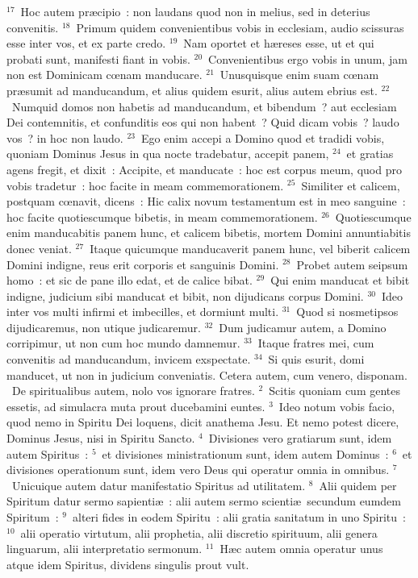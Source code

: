 ${}^{17}$~Hoc autem pr\ae cipio~: non laudans quod non in melius, sed in deterius convenitis.
${}^{18}$~Primum quidem convenientibus vobis in ecclesiam, audio scissuras esse inter vos, et ex parte credo.
${}^{19}$~Nam oportet et h\ae reses esse, ut et qui probati sunt, manifesti fiant in vobis.
${}^{20}$~Convenientibus ergo vobis in unum, jam non est Dominicam cœnam manducare.
${}^{21}$~Unusquisque enim suam cœnam pr\ae sumit ad manducandum, et alius quidem esurit, alius autem ebrius est.
${}^{22}$~Numquid domos non habetis ad manducandum, et bibendum~? aut ecclesiam Dei contemnitis, et confunditis eos qui non habent~? Quid dicam vobis~? laudo vos~? in hoc non laudo.
${}^{23}$~Ego enim accepi a Domino quod et tradidi vobis, quoniam Dominus Jesus in qua nocte tradebatur, accepit panem,
${}^{24}$~et gratias agens fregit, et dixit~: Accipite, et manducate~: hoc est corpus meum, quod pro vobis tradetur~: hoc facite in meam commemorationem.
${}^{25}$~Similiter et calicem, postquam cœnavit, dicens~: Hic calix novum testamentum est in meo sanguine~: hoc facite quotiescumque bibetis, in meam commemorationem.
${}^{26}$~Quotiescumque enim manducabitis panem hunc, et calicem bibetis, mortem Domini annuntiabitis donec veniat.
${}^{27}$~Itaque quicumque manducaverit panem hunc, vel biberit calicem Domini indigne, reus erit corporis et sanguinis Domini.
${}^{28}$~Probet autem seipsum homo~: et sic de pane illo edat, et de calice bibat.
${}^{29}$~Qui enim manducat et bibit indigne, judicium sibi manducat et bibit, non dijudicans corpus Domini.
${}^{30}$~Ideo inter vos multi infirmi et imbecilles, et dormiunt multi.
${}^{31}$~Quod si nosmetipsos dijudicaremus, non utique judicaremur.
${}^{32}$~Dum judicamur autem, a Domino corripimur, ut non cum hoc mundo damnemur.
${}^{33}$~Itaque fratres mei, cum convenitis ad manducandum, invicem exspectate.
${}^{34}$~Si quis esurit, domi manducet, ut non in judicium conveniatis. Cetera autem, cum venero, disponam.
~De spiritualibus autem, nolo vos ignorare fratres.
${}^{2}$~Scitis quoniam cum gentes essetis, ad simulacra muta prout ducebamini euntes.
${}^{3}$~Ideo notum vobis facio, quod nemo in Spiritu Dei loquens, dicit anathema Jesu. Et nemo potest dicere, Dominus Jesus, nisi in Spiritu Sancto.
${}^{4}$~Divisiones vero gratiarum sunt, idem autem Spiritus~:
${}^{5}$~et divisiones ministrationum sunt, idem autem Dominus~:
${}^{6}$~et divisiones operationum sunt, idem vero Deus qui operatur omnia in omnibus.
${}^{7}$~Unicuique autem datur manifestatio Spiritus ad utilitatem.
${}^{8}$~Alii quidem per Spiritum datur sermo sapienti\ae~: alii autem sermo scienti\ae\ secundum eumdem Spiritum~:
${}^{9}$~alteri fides in eodem Spiritu~: alii gratia sanitatum in uno Spiritu~:
${}^{10}$~alii operatio virtutum, alii prophetia, alii discretio spirituum, alii genera linguarum, alii interpretatio sermonum.
${}^{11}$~H\ae c autem omnia operatur unus atque idem Spiritus, dividens singulis prout vult.


